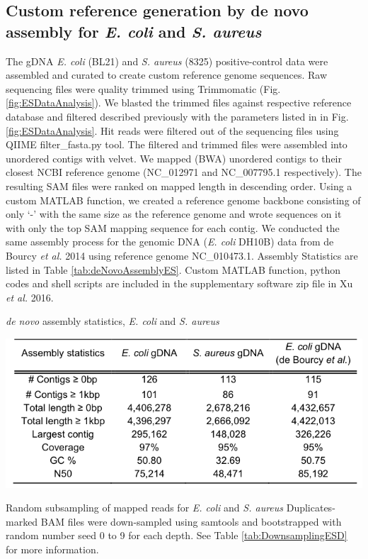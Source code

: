 \subsection{Custom reference generation by de novo assembly for \textit{E. coli} and \textit{S. aureus}}
The gDNA \textit{E. coli} (BL21) and \textit{S. aureus} (8325) positive-control data were assembled and curated to create custom reference genome sequences. Raw sequencing files were quality trimmed using Trimmomatic (Fig. \ref{fig:ESDataAnalysis}). We blasted the trimmed files against respective reference database and filtered described previously with the parameters listed in in Fig. \ref{fig:ESDataAnalysis}. Hit reads were filtered out of the sequencing files using QIIME filter\_fasta.py tool. The filtered and trimmed files were assembled into unordered contigs with velvet. We mapped (BWA) unordered contigs to their closest NCBI reference genome (NC\_012971 and NC\_007795.1 respectively). The resulting SAM files were ranked on mapped length in descending order. Using a custom MATLAB function, we created a reference genome backbone consisting of only `-' with the same size as the reference genome and wrote sequences on it with only the top SAM mapping sequence for each contig. We conducted the same assembly process for the genomic DNA (\textit{E. coli} DH10B) data from de Bourcy \textit{et al.} 2014 using reference genome NC\_010473.1. Assembly Statistics are listed in Table \ref{tab:deNovoAssemblyES}. Custom MATLAB function, python codes and shell scripts are included in the supplementary software zip file in Xu \textit{et al.} 2016. 

\begin{table}
\caption{\textit{de novo} assembly statistics, \textit{E. coli} and \textit{S. aureus}}
\label{tab:deNovoAssemblyES}
\begin{center}
\includegraphics[width=0.85\linewidth]{./figures/deNovoAssemblyES}
\end{center}
\end{table}

Random subsampling of mapped reads for \textit{E. coli} and \textit{S. aureus}
Duplicates-marked BAM files were down-sampled using samtools and bootstrapped with random number seed 0 to 9 for each depth. See Table \ref{tab:DownsamplingESD} for more information. 

